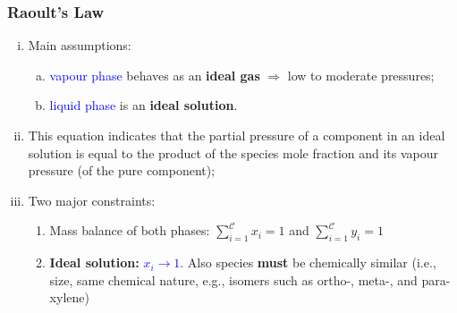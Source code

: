 \documentclass[10pt,compress,handout,ignorenonframetext,unknownkeysallowed]{beamer}
\begin{document}
\begin{frame}
  \frametitle{Raoult's Law}
  \begin{enumerate}[i)]
      \item<1-> Main assumptions:
         \begin{enumerate}[a)]
             \item<1-> \textcolor{blue}{vapour phase} behaves as an {\bf ideal gas} $\Longrightarrow$ low to moderate pressures;
             \item<1-> \textcolor{blue}{liquid phase} is an {\bf ideal solution}.
         \end{enumerate}
      \item<2-> This equation indicates that the partial pressure of a component in an ideal solution is equal to the product of the species mole fraction and its vapour pressure (of the pure component);
      \item<3-> Two major constraints:
         \begin{enumerate}
             \item<2-> Mass balance of both phases: $\sum\limits_{i=1}^{\mathcal{C}} x_{i} = 1$ and $\sum\limits_{i=1}^{\mathcal{C}} y_{i} = 1$
             \item<2-> {\bf Ideal solution:} \textcolor{blue}{$x_{i}\rightarrow 1$}. Also species {\bf must} be chemically similar (i.e., size, same chemical nature, e.g., isomers such as ortho-, meta-, and para-xylene) 
         \end{enumerate}
  \end{enumerate}
\end{frame}
\end{document}

